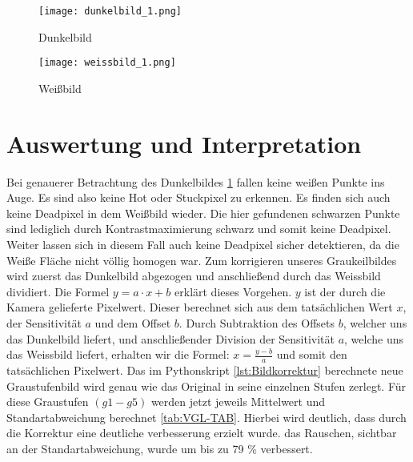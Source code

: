 \begin{figure}[H]
\centering
\texttt{[image: dunkelbild\_1.png]}
\caption{Dunkelbild}
\label{img:Dunkelbild_normal}
\end{figure}


\begin{figure}[H]
\centering
\texttt{[image: weissbild\_1.png]}
\caption{Weißbild}
\label{img:Weissbild_normal}
\end{figure}

\label{chap:VERSUCH_4_MESSWERTE}

\section{Auswertung und Interpretation}
Bei genauerer Betrachtung des Dunkelbildes \ref{img:Dunkelbild_normal} fallen keine weißen Punkte ins Auge. Es sind also keine Hot oder Stuckpixel zu erkennen. Es finden sich auch keine Deadpixel in dem Weißbild wieder. Die hier gefundenen schwarzen Punkte sind lediglich durch Kontrastmaximierung schwarz und somit keine Deadpixel. Weiter lassen sich in diesem Fall auch keine Deadpixel sicher detektieren, da die Weiße Fläche nicht völlig homogen war.
Zum korrigieren unseres Graukeilbildes wird zuerst das Dunkelbild abgezogen und anschließend durch das Weissbild dividiert. Die Formel $y = a\cdot x+b$ erklärt dieses Vorgehen. $y$ ist der durch die Kamera gelieferte Pixelwert. Dieser berechnet sich aus dem tatsächlichen Wert $x$, der Sensitivität $a$ und dem Offset $b$. Durch Subtraktion des Offsets $b$, welcher uns das Dunkelbild liefert, und anschließender Division der Sensitivität $a$, welche uns das Weissbild liefert, erhalten wir die Formel: $x = \frac{y-b}{a}$ und somit den tatsächlichen Pixelwert.
Das im Pythonskript \ref{lst:Bildkorrektur} berechnete neue Graustufenbild wird genau wie das Original in seine einzelnen Stufen zerlegt. Für diese Graustufen $(g1 - g5)$ werden jetzt jeweils Mittelwert und Standartabweichung berechnet \ref{tab:VGL-TAB}. Hierbei wird deutlich, dass durch die Korrektur eine deutliche verbesserung erzielt wurde. das Rauschen, sichtbar an der Standartabweichung, wurde um bis zu 79 \% verbessert.

